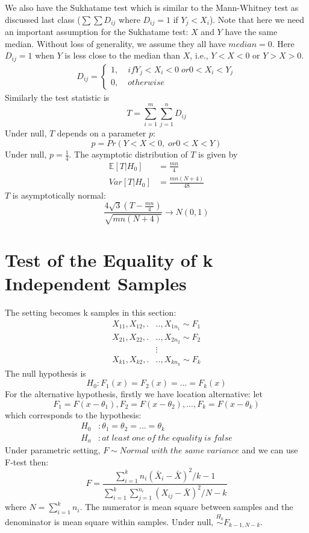 \documentclass[twoside]{article}
\begin{document}
	We also have the Sukhatame test which is similar to the Mann-Whitney test as discussed last class ($\sum \sum D_{ij}$ where $D_{ij}=1$ if $Y_j < X_i$). Note that here we need an important assumption for the Sukhatame test: $X$ and $Y$ have the same median. Without loss of generality, we assume they all have $median=0$. Here $D_{ij}=1$ when $Y$ is less close to the median than $X$, i.e., $Y<X<0$ or $Y>X>0$. 
	\begin{align*}
		D_{ij} = \begin{cases}
			1, \; &if Y_j < X_i <0 \; or 0 < X_i < Y_j \\
			0, \; &otherwise
		\end{cases}
	\end{align*}
	Similarly the test statistic is 
	$$
	T = \sum_{i=1}^{m} \sum_{j=1}^{n} D_{ij}
	$$
	Under null, $T$ depends on a parameter $p$:
	$$
	p = Pr \left( Y<X<0, \; or 0<X<Y \right)
	$$
	Under null, $p = \frac{1}{4}$. The asymptotic distribution of $T$ is given by
	\begin{align*}
		\mathbb{E} \left[ T | H_0 \right] &= \frac{mn}{4} \\
		Var \left[ T | H_0 \right] &= \frac{mn(N+4)}{48}
	\end{align*}
	$T$ is asymptotically normal:
	$$
	\frac{4 \sqrt{3} \left( T - \frac{mn}{4} \right)}{\sqrt{mn(N+4)}} \rightarrow N \left(0, 1 \right)
	$$

	\section{Test of the Equality of k Independent Samples}
	The setting becomes k samples in this section: 
	\begin{align*}
		X_{11}, X_{12}, .&.., X_{1 n_1} \sim F_1 \\
		X_{21}, X_{22}, .&.., X_{2 n_2} \sim F_2 \\
		&\vdots \\
		X_{k1}, X_{k2}, .&.., X_{k n_k} \sim F_k
	\end{align*}
	The null hypothesis is
	$$
	H_0: F_1(x) = F_2(x) = ... = F_k(x)
	$$
	For the alternative hypothesis, firstly we have location alternative: let
	$$
	F_1 = F(x - \theta_1), F_2 = F(x - \theta_2), ..., F_k = F(x - \theta_k)
	$$
	which corresponds to the hypothesis: 
	\begin{align*}
		H_0 &: \theta_1 = \theta_2 = ... = \theta_k \\
		H_a &: at \; least \; one \; of \; the \; equality \; is \; false
	\end{align*}
	Under parametric setting, $F \sim Normal \; with \; the \; same \; variance$ and we can use F-test then: 
	$$
	F = \frac{\sum_{i=1}^{k} n_i \left( \bar{X}_i - \bar{X} \right)^2/k-1}{\sum_{i=1}^{k} \sum_{j=1}^{n_i} \left( X_{ij} - \bar{X} \right)^2/N-k}
	$$
	where $N = \sum_{i=1}^{k} n_i$. The numerator is mean square between samples and the denominator is mean square within samples. Under null, $\stackrel{H_0}{\sim} F_{k-1, N-k}$. 
	
\end{document}
